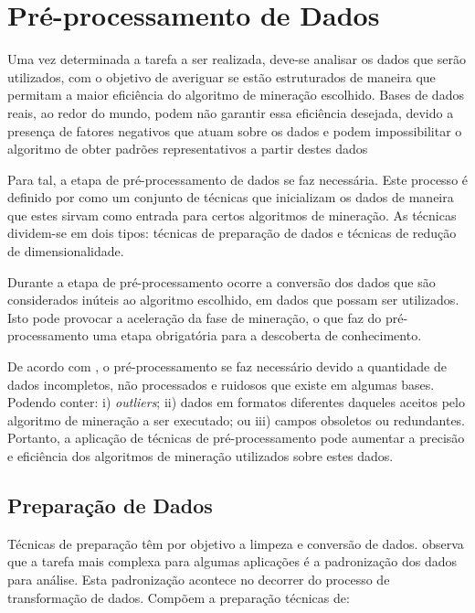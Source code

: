 \section{Pré-processamento de Dados}
\label{sec:data-preproces}

Uma vez determinada a tarefa a ser realizada, deve\hyp{}se analisar os dados que serão utilizados, com o objetivo de averiguar se estão estruturados de maneira que permitam a maior eficiência do algoritmo de mineração escolhido. Bases de dados reais, ao redor do mundo, podem não garantir essa eficiência desejada, devido a presença de fatores negativos que atuam sobre os dados e podem impossibilitar o algoritmo de obter padrões representativos a partir destes dados

Para tal, a etapa de pré\hyp{}processamento de dados se faz necessária. Este processo é definido por  como um conjunto de técnicas que inicializam os dados de maneira que estes sirvam como entrada para certos algoritmos de mineração. As técnicas dividem-se em dois tipos: técnicas de preparação de dados e técnicas de redução de dimensionalidade.

Durante a etapa de pré\hyp{}processamento ocorre a conversão dos dados que são considerados inúteis ao algoritmo escolhido, em dados que possam ser utilizados. Isto pode provocar a aceleração da fase de mineração, o que faz do pré\hyp{}processamento uma etapa obrigatória para a descoberta de conhecimento.

De acordo com , o pré\hyp{}processamento se faz necessário devido a quantidade de dados incompletos, não processados e ruidosos que existe em algumas bases. Podendo conter: i) \textit{outliers}; ii) dados em formatos diferentes daqueles aceitos pelo algoritmo de mineração a ser executado; ou iii) campos obsoletos ou redundantes. Portanto, a aplicação de técnicas de pré\hyp{}processamento pode aumentar a precisão e eficiência dos algoritmos de mineração utilizados sobre estes dados.

\subsection{Preparação de Dados}
\label{subsec:data-prep}

Técnicas de preparação têm por objetivo a limpeza e conversão de dados.  observa que a tarefa mais complexa para algumas aplicações é a padronização dos dados para análise. Esta padronização acontece no decorrer do processo de transformação de dados. Compõem a preparação técnicas de:

